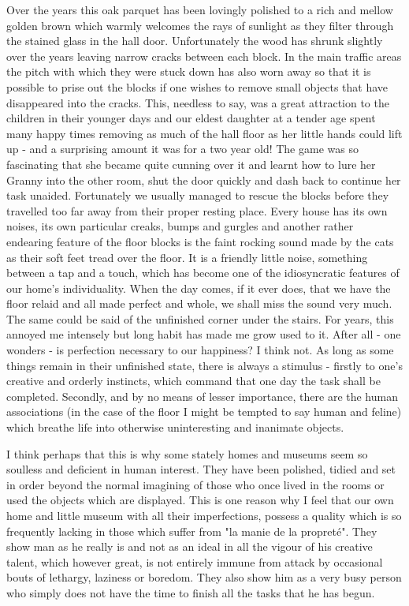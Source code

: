 Over the years this oak parquet has been lovingly polished to a rich and mellow golden brown which warmly welcomes the rays of sunlight as they filter through the stained glass in the hall door. Unfortunately the wood has shrunk slightly over the years leaving narrow cracks between each block. In the main traffic areas the pitch with which they were stuck down has also worn away so that it is possible to prise out the blocks if one wishes to remove small objects that have disappeared into the cracks. This, needless to say, was a great attraction to the children in their younger days and our eldest daughter at a tender age spent many happy times removing as much of the hall floor as her little hands could lift up - and a surprising amount it was for a two year old! The game was so fascinating that she became quite cunning over it and learnt how to lure her Granny into the other room, shut the door quickly and dash back to continue her task unaided. Fortunately we usually managed to rescue the blocks before they travelled too far away from their proper resting place. Every house has its own noises, its own particular creaks, bumps and gurgles and another rather endearing feature of the floor blocks is the faint rocking sound made by the cats as their soft feet tread over the floor. It is a friendly little noise, something between a tap and a touch, which has become one of the idiosyncratic features of our home's individuality. When the day comes, if it ever does, that we have the floor relaid and all made perfect and whole, we shall miss the sound very much. The same could be said of the unfinished corner under the stairs. For years, this annoyed me intensely but long habit has made me grow used to it. After all - one wonders - is perfection necessary to our happiness? I think not. As long as some things remain in their unfinished state, there is always a stimulus - firstly to one's creative and orderly instincts, which command that one day the task shall be completed. Secondly, and by no means of lesser importance, there are the human associations (in the case of the floor I might be tempted to say human and feline) which breathe life into otherwise uninteresting and inanimate objects.

I think perhaps that this is why some stately homes and museums seem so soulless and deficient in human interest. They have been polished, tidied and set in order beyond the normal imagining of those who once lived in the rooms or used the objects which are displayed. This is one reason why I feel that our own home and little museum with all their imperfections, possess a quality which is so frequently lacking in those which suffer from "la manie de la propreté". They show man as he really is and not as an ideal in all the vigour of his creative talent, which however great, is not entirely immune from attack by occasional bouts of lethargy, laziness or boredom. They also show him as a very busy person who simply does not have the time to finish all the tasks that he has begun.

